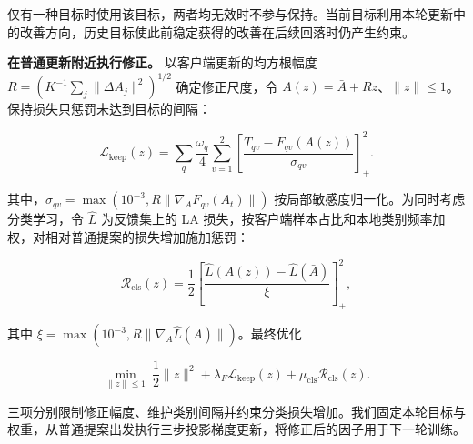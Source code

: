 \documentclass[10pt,twocolumn,letterpaper]{article}
\begin{document}
仅有一种目标时使用该目标，两者均无效时不参与保持。当前目标利用本轮更新中的改善方向，历史目标使此前稳定获得的改善在后续回落时仍产生约束。


\textbf{在普通更新附近执行修正。} 以客户端更新的均方根幅度 $R=(K^{-1}\sum_j\|\Delta A_j\|^2)^{1/2}$ 确定修正尺度，令 $A(z)=\bar A+Rz$、$\|z\|\leq1$。保持损失只惩罚未达到目标的间隔：


\begin{equation}\mathcal L_{\mathrm{keep}}(z)=\sum_q\frac{\omega_q}{4}\sum_{v=1}^{2}
\left[\frac{T_{qv}-F_{qv}(A(z))}{\sigma_{qv}}\right]_+^2.\end{equation}

其中，$\sigma_{qv}=\max(10^{-3},R\|\nabla_A F_{qv}(A_t)\|)$ 按局部敏感度归一化。为同时考虑分类学习，令 $\widehat L$ 为反馈集上的 LA 损失，按客户端样本占比和本地类别频率加权，对相对普通提案的损失增加施加惩罚：


\begin{equation}\mathcal R_{\mathrm{cls}}(z)=\frac12\left[
\frac{\widehat L(A(z))-\widehat L(\bar A)}{\xi}
\right]_+^2,\end{equation}

其中 $\xi=\max(10^{-3},R\|\nabla_A\widehat L(\bar A)\|)$。最终优化


\begin{equation}\min_{\|z\|\leq1}\ \frac12\|z\|^2+
\lambda_F\mathcal L_{\mathrm{keep}}(z)+\mu_{\mathrm{cls}}\mathcal R_{\mathrm{cls}}(z).\end{equation}

三项分别限制修正幅度、维护类别间隔并约束分类损失增加。我们固定本轮目标与权重，从普通提案出发执行三步投影梯度更新，将修正后的因子用于下一轮训练。
\end{document}
